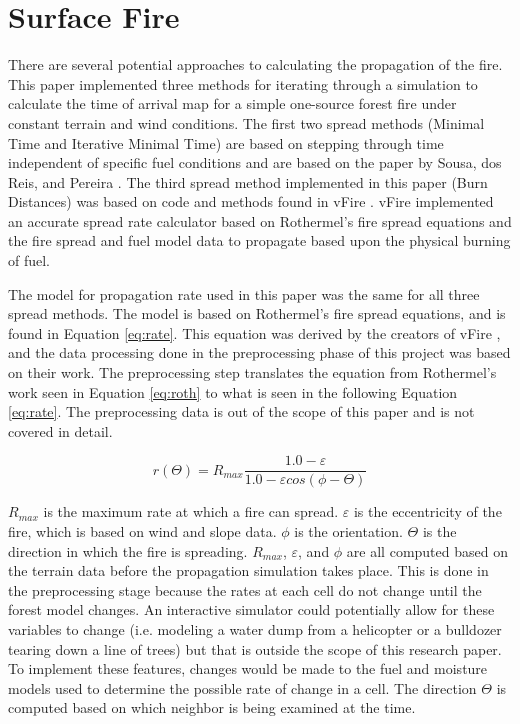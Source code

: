 \section{Surface Fire}
There are several potential approaches to calculating the propagation of the fire. This paper implemented three methods for iterating through a simulation to calculate the time of arrival map for a simple one-source forest fire under constant terrain and wind conditions. The first two spread methods (Minimal Time and Iterative Minimal Time) are based on stepping through time independent of specific fuel conditions and are based on the paper by Sousa, dos Reis, and Pereira \cite{gpufire}. The third spread method implemented in this paper (Burn Distances) was based on code and methods found in vFire \cite{vFire}. vFire implemented an accurate spread rate calculator based on Rothermel's fire spread equations and the fire spread and fuel model data to propagate based upon the physical burning of fuel.

The model for propagation rate used in this paper was the same for all three spread methods. The model is based on Rothermel's fire spread equations, and is found in Equation \ref{eq:rate}. This equation was derived by the creators of vFire \cite{vFire}, and the data processing done in the preprocessing phase of this project was based on their work. The preprocessing step translates the equation from Rothermel's work seen in Equation \ref{eq:roth} to what is seen in the following Equation \ref{eq:rate}. The preprocessing data is out of the scope of this paper and is not covered in detail. 

\begin{equation}
r(\Theta ) = R_{max}\frac{1.0 - \varepsilon }{1.0 - \varepsilon cos(\phi-\Theta )}
\label{eq:rate}
\end{equation}

$R_{max}$ is the maximum rate at which a fire can spread. $\varepsilon$ is the eccentricity of the fire, which is based on wind and slope data. $\phi$ is the orientation. $\Theta$ is the direction in which the fire is spreading. $R_{max}$, $\varepsilon$, and $\phi$ are all computed based on the terrain data before the propagation simulation takes place. This is done in the preprocessing stage because the rates at each cell do not change until the forest model changes. An interactive simulator could potentially allow for these variables to change (i.e. modeling a water dump from a helicopter or a bulldozer tearing down a line of trees) but that is outside the scope of this research paper. To implement these features, changes would be made to the fuel and moisture models used to determine the possible rate of change in a cell. The direction $\Theta$ is computed based on which neighbor is being examined at the time. 

